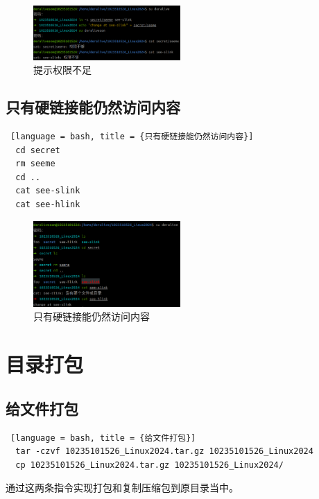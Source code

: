 \documentclass[14pt,a4paper,UTF8,twoside]{article}
\begin{document}
\begin{figure}[H]
  \centering
  \includegraphics[width=0.5\textwidth]{lec2/alsocant.png}
  \caption{提示权限不足}
  \label{fig:9}
\end{figure}

\subsection{只有硬链接能仍然访问内容}

\begin{lstlisting} [language = bash, title = {只有硬链接能仍然访问内容}]
  cd secret
  rm seeme
  cd ..
  cat see-slink
  cat see-hlink
\end{lstlisting}

\begin{figure} [H]
  \centering
  \includegraphics[width=0.5\textwidth]{lec2/final.png}
  \caption{只有硬链接能仍然访问内容}
  \label{fig:10}
\end{figure}

\section{目录打包}

\subsection{给文件打包}

\begin{lstlisting} [language = bash, title = {给文件打包}]
  tar -czvf 10235101526_Linux2024.tar.gz 10235101526_Linux2024
  cp 10235101526_Linux2024.tar.gz 10235101526_Linux2024/
\end{lstlisting}

通过这两条指令实现打包和复制压缩包到原目录当中。
\end{document}
